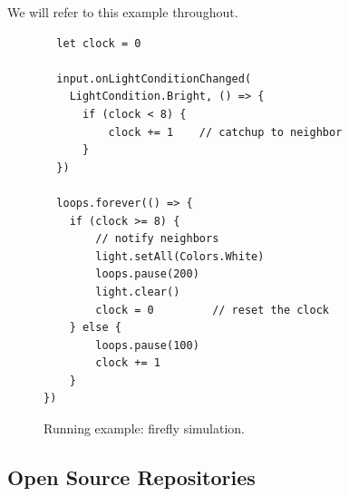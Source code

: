 We will refer to this example throughout.

\begin{figure}
\begin{lstlisting}
  let clock = 0

  input.onLightConditionChanged(
    LightCondition.Bright, () => {
      if (clock < 8) {
          clock += 1    // catchup to neighbor
      }
  })

  loops.forever(() => {
    if (clock >= 8) {
        // notify neighbors
        light.setAll(Colors.White)
        loops.pause(200)
        light.clear()
        clock = 0         // reset the clock
    } else {
        loops.pause(100)
        clock += 1
    }
})
\end{lstlisting}
\caption{\label{fig:example}Running example: firefly simulation.}
\end{figure}

\subsection{Open Source Repositories}
